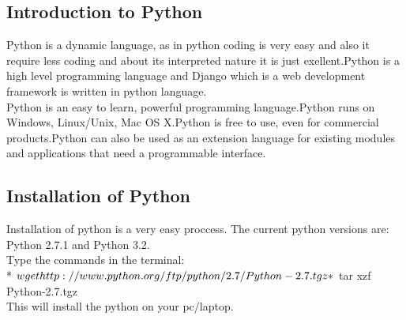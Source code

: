 \subsection{Introduction to Python}
\Python Python is a dynamic language, as in python coding is very easy and also it require less coding and about its interpreted nature it is just exellent.Python is a high level programming language and Django which is a web development framework is written in python language.\\
Python is an easy to learn, powerful programming language.Python runs on Windows, Linux/Unix, Mac OS X.Python is free to use, even for commercial products.Python can also be used as an extension language for existing modules and applications that need a programmable interface.\\

\newpage
\subsection{Installation of Python}
Installation of python is a very easy proccess.
The current python versions are: Python 2.7.1 and Python 3.2.\\
Type the commands in the terminal:\\
* $ wget http://www.python.org/ftp/python/2.7/Python-2.7.tgz\\
* $ tar xzf Python-2.7.tgz\\
This will install the python on your pc/laptop.


